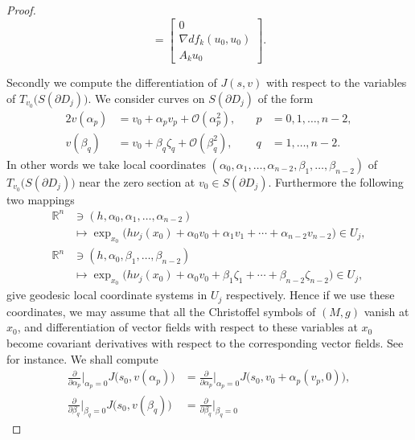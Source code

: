 \documentclass[a4paper,11pt,reqno]{amsart}
\numberwithin{equation}{section}
\theoremstyle{definition}
\theoremstyle{remark}
\begin{document}
\begin{proof}
\begin{equation}
=
\begin{bmatrix}
0
\\
{\nabla}df_k(u_0,u_0) 
\\
A_ku_0
\end{bmatrix}. 
\label{equation:000}
\end{equation}
%
%
\par
%
%
Secondly we compute the differentiation of $J(s,v)$ with respect to the variables of 
$T_{v_0}\bigl(S(\partial{D_j})\bigr)$. 
We consider curves on $S(\partial{D_j})$ of the form 
%
%
\begin{alignat*}{2}
  v(\alpha_p)
& =
  v_0+\alpha_pv_p+\mathcal{O}(\alpha_p^2),
& \quad
  p
& =
  0,1,\dotsc,n-2,
\\
  v(\beta_q)
& =
  v_0+\beta_q\zeta_q+\mathcal{O}(\beta_q^2),
& \quad
  q
& =
  1,\dotsc,n-2. 
\end{alignat*}
%
%
In other words we take local coordinates 
$(\alpha_0,\alpha_1,\dotsc,\alpha_{n-2},\beta_1,\dotsc,\beta_{n-2})$ 
of $T_{v_0}\bigl(S(\partial{D_j})\bigr)$ near the zero section at $v_0 \in S(\partial{D_j})$. 
Furthermore the following two mappings  
%
%
\begin{align*}
  \mathbb{R}^n
&  \ni 
  (h,\alpha_0,\alpha_1,\dotsc,\alpha_{n-2})
\\
& \mapsto 
  \exp_{x_0}\bigl(h\nu_j(x_0)+\alpha_0v_0+\alpha_1v_1+\dotsb+\alpha_{n-2}v_{n-2}\bigr) \in U_j,
\\
  \mathbb{R}^n
& \ni 
  (h,\alpha_0,\beta_1,\dotsc,\beta_{n-2})
\\
& \mapsto 
  \exp_{x_0}\bigl(h\nu_j(x_0)+\alpha_0v_0+\beta_1\zeta_1+\dotsb+\beta_{n-2}\zeta_{n-2}\bigr) \in U_j,
\end{align*}
%
%
give geodesic local coordinate systems in $U_j$ respectively. 
Hence if we use these coordinates, we may assume 
that all the Christoffel symbols of $(M,g)$ vanish at $x_0$, 
and differentiation of vector fields with respect to these variables 
at $x_0$ become covariant derivatives with respect to the corresponding vector fields. 
See \cite[Exercise~4 in Page~37 and its Solution in Page~326]{Sakai} 
for instance. We shall compute 
%
%
\begin{align*}
  \frac{\partial}{\partial \alpha_p}\bigg\vert_{\alpha_p=0}
  J\bigl(s_0,v(\alpha_p)\bigr)
& =
  \frac{\partial}{\partial \alpha_p}\bigg\vert_{\alpha_p=0}
  J\bigl(s_0,v_0+\alpha_p(v_p,0)\bigr),
\\
  \frac{\partial}{\partial \beta_q}\bigg\vert_{\beta_q=0}
  J\bigl(s_0,v(\beta_q)\bigr)
& =
  \frac{\partial}{\partial \beta_q}\bigg\vert_{\beta_q=0}

\end{align*}
\end{proof}
\end{document}
